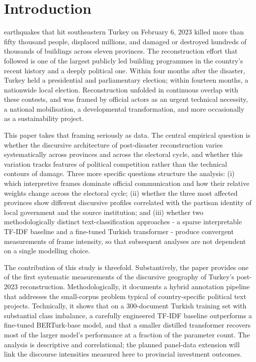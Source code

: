 \documentclass[12pt, journal]{IEEEtran}
\begin{document}
\section{Introduction}
 earthquakes that hit southeastern Turkey on February 6, 2023 killed more than fifty thousand people, displaced millions, and damaged or destroyed hundreds of thousands of buildings across eleven provinces. The reconstruction effort that followed is one of the largest publicly led building programmes in the country's recent history and a deeply political one. Within four months after the disaster, Turkey held a presidential and parliamentary election; within fourteen months, a nationwide local election. Reconstruction unfolded in continuous overlap with these contests, and was framed by official actors as an urgent technical necessity, a national mobilisation, a developmental transformation, and more occasionally as a sustainability project.

This paper takes that framing seriously as data. The central empirical question is whether the discursive architecture of post-disaster reconstruction varies systematically across provinces and across the electoral cycle, and whether this variation tracks features of political competition rather than the technical contours of damage. Three more specific questions structure the analysis: (i) which interpretive frames dominate official communication and how their relative weights change across the electoral cycle; (ii) whether the three most affected provinces show different discursive profiles correlated with the partisan identity of local government and the source institution; and (iii) whether two methodologically distinct text-classification approaches - a sparse interpretable TF-IDF baseline and a fine-tuned Turkish transformer - produce convergent measurements of frame intensity, so that subsequent analyses are not dependent on a single modelling choice.

\IEEEpubidadjcol The contribution of this study is threefold. Substantively, the paper provides one of the first systematic measurements of the discursive geography of Turkey's post-2023 reconstruction. Methodologically, it documents a hybrid annotation pipeline that addresses the small-corpus problem typical of country-specific political text projects. Technically, it shows that on a 300-document Turkish training set with substantial class imbalance, a carefully engineered TF-IDF baseline outperforms a fine-tuned BERTurk-base model, and that a smaller distilled transformer recovers most of the larger model's performance at a fraction of the parameter count. The analysis is descriptive and correlational; the planned panel-data extension will link the discourse intensities measured here to provincial investment outcomes.
\end{document}
